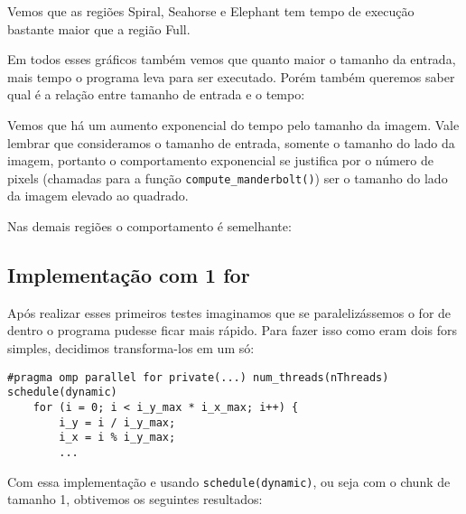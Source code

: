 \documentclass[12pt]{article}
\newcommand{\code}[1]{\texttt{#1}}
\begin{document}
Vemos que as regiões Spiral, Seahorse e Elephant tem tempo de execução bastante maior que a região Full.

Em todos esses gráficos também vemos que quanto maior o tamanho da entrada, mais tempo o programa leva para ser executado. Porém também queremos saber qual é a relação entre tamanho de entrada e o tempo:

\begin{figure}[H]
\end{figure}

Vemos que há um aumento exponencial do tempo pelo tamanho da imagem. Vale lembrar que consideramos o tamanho de entrada, somente o tamanho do lado da imagem, portanto o comportamento exponencial se justifica por o número de pixels (chamadas para a função \code{compute\_manderbolt()}) ser o tamanho do lado da imagem elevado ao quadrado.

Nas demais regiões o comportamento é semelhante:

\begin{figure}[H]
\end{figure}

\subsection{Implementação com 1 for}
Após realizar esses primeiros testes imaginamos que se paralelizássemos o for de dentro o programa pudesse ficar mais rápido. Para fazer isso como eram dois fors simples, decidimos transforma-los em um só:

\begin{lstlisting}[style=CStyle]
    #pragma omp parallel for private(...) num_threads(nThreads) schedule(dynamic)
    for (i = 0; i < i_y_max * i_x_max; i++) {
        i_y = i / i_y_max;
        i_x = i % i_y_max;
        ...
\end{lstlisting}

Com essa implementação e usando \code{schedule(dynamic)}, ou seja com o chunk de tamanho 1, obtivemos os seguintes resultados:

\begin{figure}[H]
\end{figure}
\end{document}
